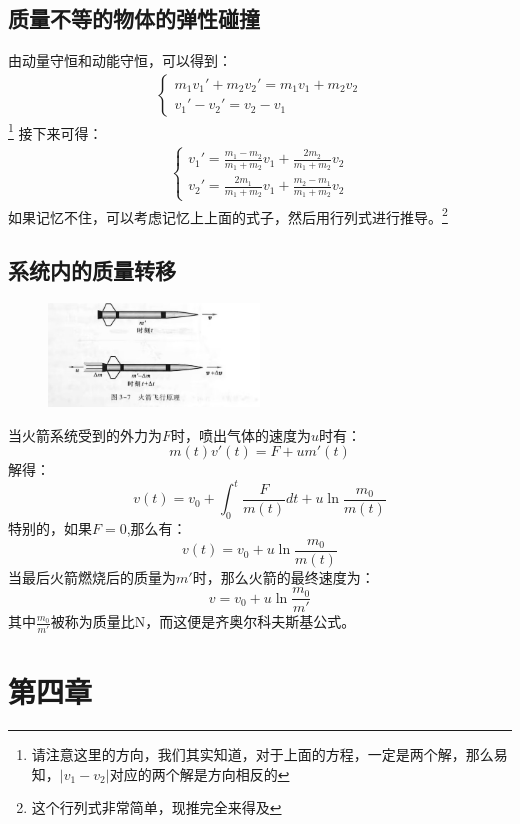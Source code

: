 \documentclass{ctexart}
\begin{document}
\subsection{质量不等的物体的弹性碰撞}
由动量守恒和动能守恒，可以得到：
\begin{align*}
    \begin{cases}
        m_1v_1' + m_2v_2' = m_1v_1 + m_2v_2 \\
        v_1' - v_2' = v_2 - v_1
    \end{cases}
\end{align*}
\footnote{请注意这里的方向，我们其实知道，对于上面的方程，一定是两个解，那么易知，$ |v_1 - v_2| $对应的两个解是方向相反的}
接下来可得：
\begin{align*}
    \begin{cases}
        v_1' = \frac{m_1 - m_2}{m_1 + m_2}v_1 + \frac{2m_2}{m_1 + m_2}v_2 \\
        v_2' = \frac{2m_1}{m_1 + m_2}v_1 + \frac{m_2 - m_1}{m_1 + m_2}v_2
    \end{cases}
\end{align*}
如果记忆不住，可以考虑记忆上上面的式子，然后用行列式进行推导。\footnote{这个行列式非常简单，现推完全来得及}
\subsection{系统内的质量转移}
\begin{figure}[H]
    \centering
    \includegraphics[width=0.5\textwidth]{img/3-7.jpg}
\end{figure}
当火箭系统受到的外力为$F$时，喷出气体的速度为$u$时有：
$$
    m(t) v'(t) = F + u m'(t)
$$
解得：
$$
    v(t) = v_0 + \int_0^t \frac{F}{m(t)}dt + u \ln \frac{m_0}{m(t)}
$$
特别的，如果$F = 0$,那么有：
$$
    v(t) = v_0 + u \ln \frac{m_0}{m(t)}
$$
当最后火箭燃烧后的质量为$m'$时，那么火箭的最终速度为：
$$
    v = v_0 + u \ln \frac{m_0}{m'}
$$
其中$\frac{m_0}{m'}$被称为质量比N，而这便是齐奥尔科夫斯基公式。
\section{第四章}
\end{document}
